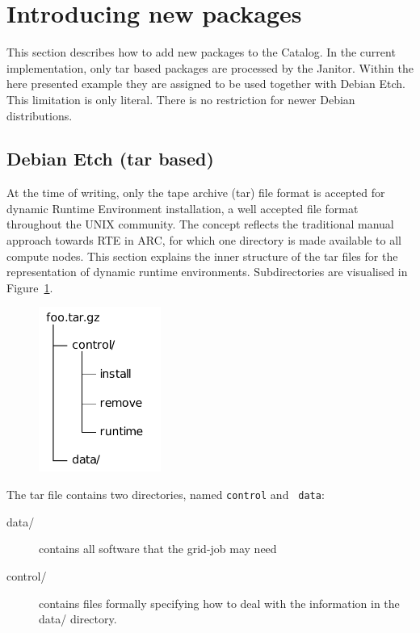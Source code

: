 \section{Introducing new packages}\label{sec:catalog}\label{sec:introducing_new_packages}

This section describes how to add new packages to the Catalog. In
the current implementation, only tar based packages are processed by
the Janitor.  Within the here presented example they are assigned to
be used together with Debian Etch. This limitation is only literal.
There is no restriction for newer Debian distributions.

\subsection{Debian Etch (tar based)}

At the time of writing, only the tape archive (tar) file format is
accepted for dynamic Runtime Environment installation, a well accepted
file format throughout the UNIX community.
The concept reflects the
traditional manual approach towards RTE in ARC, for which one directory
is made available to all compute nodes.
This section explains the inner structure of the tar files for the
representation of dynamic runtime environments.  Subdirectories are
visualised in Figure~\ref{fig:tar_folder}.

\begin{figure}
  \begin{center}
    \includegraphics[width=4cm]{images/tar_folder.pdf}
    \label{fig:tar_folder}
  \end{center}
\end{figure}

The tar file contains two directories, named {\tt control} and {\tt
data}:

\begin{description}
\item [data/] contains all software that the grid-job may need
\item [control/] contains files formally specifying how to deal
	with the information in the data/ directory.
\end{description}

